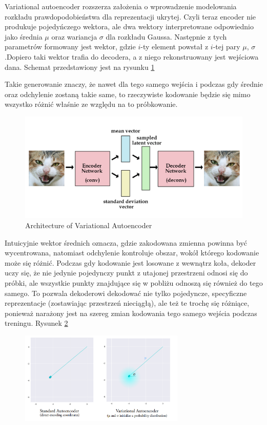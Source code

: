 Variational autoencoder rozszerza założenia o wprowadzenie modelowania rozkładu prawdopodobieństwa dla reprezentacji ukrytej. Czyli teraz encoder nie produkuje pojedyńczego wektora, ale dwa wektory interpretowane odpowiednio jako średnia $\mu$ oraz wariancja $\sigma$ dla rozkładu Gaussa. Następnie z tych parametrów formowany jest wektor, gdzie $i$-ty element powstał z $i$-tej pary $\mu$, $\sigma$.Dopiero taki wektor trafia do decodera, a z niego rekonstruowany jest wejściowa dana. Schemat przedstawiony jest na rysunku \ref{fig:vae_model}

Takie generowanie znaczy, że nawet dla tego samego wejścia i podczas gdy średnie oraz odchylenie zostaną takie same, to rzeczywiste kodowanie będzie się mimo wszystko różnić właśnie ze względu na to próbkowanie. 

\begin{figure}[h!]
    \centering
    \includegraphics[width=1.0\textwidth]{images/vae_model}
    \caption{Architecture of Variational Autoencoder}
    \label{fig:vae_model}
\end{figure}

Intuicyjnie wektor średnich oznacza, gdzie zakodowana zmienna powinna być wycentrowana, natomiast odchylenie kontroluje obszar, wokół którego kodowanie może się różnić. Podczas gdy kodowanie jest losowane z wewnątrz koła, dekoder uczy się, że nie jedynie pojedynczy punkt z utajonej przestrzeni odnosi się do próbki, ale wszystkie punkty znajdujące się w pobliżu odnoszą się również do tego samego. To pozwala dekoderowi dekodować nie tylko pojedyncze, specyficzne reprezentacje (zostawiając przestrzeń nieciągłą), ale też te trochę się różniące, ponieważ narażony jest na szereg zmian kodowania tego samego wejścia podczas treningu. Rysunek \ref{fig:vae_vs_stand}

\begin{figure}[h!]
    \centering
    \includegraphics[width=0.7\textwidth]{images/vae_vs_stand}
    \caption{}
    \label{fig:vae_vs_stand}
\end{figure}

